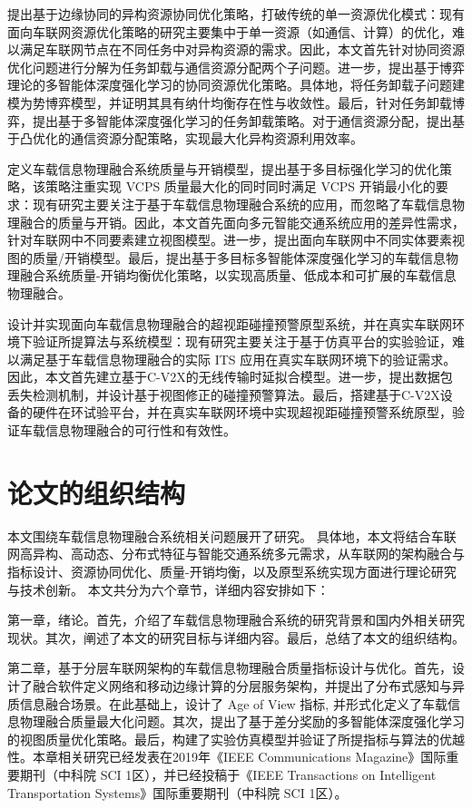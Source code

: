  提出基于边缘协同的异构资源协同优化策略，打破传统的单一资源优化模式：现有面向车联网资源优化策略的研究主要集中于单一资源（如通信、计算）的优化，难以满足车联网节点在不同任务中对异构资源的需求。因此，本文首先针对协同资源优化问题进行分解为任务卸载与通信资源分配两个子问题。进一步，提出基于博弈理论的多智能体深度强化学习的协同资源优化策略。具体地，将任务卸载子问题建模为势博弈模型，并证明其具有纳什均衡存在性与收敛性。最后，针对任务卸载博弈，提出基于多智能体深度强化学习的任务卸载策略。对于通信资源分配，提出基于凸优化的通信资源分配策略，实现最大化异构资源利用效率。

 定义车载信息物理融合系统质量与开销模型，提出基于多目标强化学习的优化策略，该策略注重实现 VCPS 质量最大化的同时同时满足 VCPS 开销最小化的要求：现有研究主要关注于基于车载信息物理融合系统的应用，而忽略了车载信息物理融合的质量与开销。因此，本文首先面向多元智能交通系统应用的差异性需求，针对车联网中不同要素建立视图模型。进一步，提出面向车联网中不同实体要素视图的质量/开销模型。最后，提出基于多目标多智能体深度强化学习的车载信息物理融合系统质量-开销均衡优化策略，以实现高质量、低成本和可扩展的车载信息物理融合。

 设计并实现面向车载信息物理融合的超视距碰撞预警原型系统，并在真实车联网环境下验证所提算法与系统模型：现有研究主要关注于基于仿真平台的实验验证，难以满足基于车载信息物理融合的实际 ITS 应用在真实车联网环境下的验证需求。因此，本文首先建立基于C-V2X的无线传输时延拟合模型。进一步，提出数据包丢失检测机制，并设计基于视图修正的碰撞预警算法。最后，搭建基于C-V2X设备的硬件在环试验平台，并在真实车联网环境中实现超视距碰撞预警系统原型，验证车载信息物理融合的可行性和有效性。

\section{论文的组织结构}\label{section 1-7}
本文围绕车载信息物理融合系统相关问题展开了研究。
具体地，本文将结合车联网高异构、高动态、分布式特征与智能交通系统多元需求，从车联网的架构融合与指标设计、资源协同优化、质量-开销均衡，以及原型系统实现方面进行理论研究与技术创新。
本文共分为六个章节，详细内容安排如下：

第一章，绪论。首先，介绍了车载信息物理融合系统的研究背景和国内外相关研究现状。其次，阐述了本文的研究目标与详细内容。最后，总结了本文的组织结构。

第二章，基于分层车联网架构的车载信息物理融合质量指标设计与优化。首先，设计了融合软件定义网络和移动边缘计算的分层服务架构，并提出了分布式感知与异质信息融合场景。在此基础上，设计了 Age of View 指标, 并形式化定义了车载信息物理融合质量最大化问题。其次，提出了基于差分奖励的多智能体深度强化学习的视图质量优化策略。最后，构建了实验仿真模型并验证了所提指标与算法的优越性。本章相关研究已经发表在2019年《IEEE Communications Magazine》国际重要期刊（中科院 SCI 1区），并已经投稿于《IEEE Transactions on Intelligent Transportation Systems》国际重要期刊（中科院 SCI 1区）。

